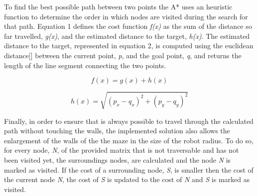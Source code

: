 \documentclass[oribibl]{llncs}
\begin{document}
To find the best possible path between two points the A* uses an heuristic function to determine the order in which nodes are visited during the search for that path. Equation 1 defines the cost function \textit{f(x)} as the sum of the distance so far travelled, \textit{g(x)}, and the estimated distance to the target, \textit{h(x)}. The estimated distance to the target, represented in equation 2, is computed using the euclidean distance[] between the current point, \textit{p}, and the goal point, \textit{q}, and returns the length of the line segment connecting the two points.

\begin{equation}
f(x) = g(x) + h(x)
\end{equation}

\begin{equation}
h(x) = \sqrt{(p_x - q_x)^2 + (p_y - q_y)^2}
\end{equation}

Finally, in order to ensure that is always possible to travel through the calculated path without touching the walls, the implemented solution also allows the enlargement of the walls of the the maze in the size of the robot radius. To do so, for every node, \textit{N}, of the provided matrix that is not traversable and has not been visited yet, the surroundings nodes, are calculated and the node \textit{N} is marked as visited. If the cost of a surrounding node, \textit{S}, is smaller then the cost of the current node \textit{N}, the cost of \textit{S} is updated to the cost of \textit{N} and \textit{S} is marked as visited.
\end{document}
